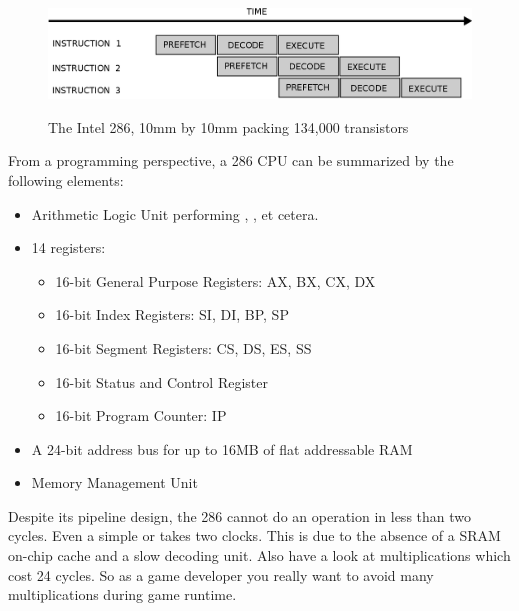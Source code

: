 \documentclass[book.tex]{subfiles}
\begin{document}
\begin{figure}[H]
\centering
\includegraphics[width=\textwidth]{imgs/drawings/instruction_pipeline.eps}\\
\end{figure}
\par
\begin{figure}[H]
\centering

\caption{The Intel 286, 10mm by 10mm packing 134,000 transistors}
\end{figure}
\par
From a programming perspective, a 286 CPU can be summarized by the following elements:
\begin{itemize}
\item Arithmetic Logic Unit performing , ,  et cetera.
\item 14 registers:
\begin{itemize}
  \item 16-bit General Purpose Registers: AX, BX, CX, DX
  \item 16-bit Index Registers: SI, DI, BP, SP
  \item 16-bit Segment Registers: CS, DS, ES, SS
  \item 16-bit Status and Control Register
  \item 16-bit Program Counter: IP
\end{itemize}
\item A 24-bit address bus for up to 16MB of flat addressable RAM
\item Memory Management Unit
\end{itemize}
 \par

Despite its pipeline design, the 286 cannot do an operation in less than two cycles. Even a simple  or  takes two clocks. This is due to the absence of a SRAM on-chip cache and a slow decoding unit. Also have a look at multiplications which cost 24 cycles. So as a game developer you really want to avoid many multiplications during game runtime.\\
 \par
 
\end{document}
